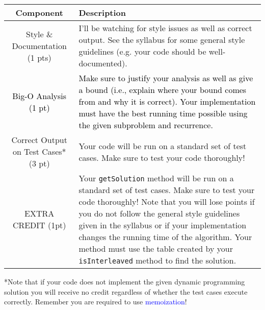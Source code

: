 \documentclass[11pt]{exam}
\begin{document}
\begin{center}
  \begin{tabular}{| c | p{9cm} |}
	\hline
	Component & Description 	\\
    \hline
    Style \& Documentation  (1 pts) & I'll be watching for style issues as well as correct output.  See the syllabus for some general style guidelines (e.g. your code should be well-documented). 
		\\ \hline
		\textcolor{black}{Big-O Analysis (1 pt)} & \textcolor{black}{Make sure to justify your analysis as well as give a bound (i.e., explain where your bound comes from and why it is correct).  Your implementation must have the best running time possible using the given subproblem and recurrence.}\\
		\hline
 Correct Output on Test Cases* (3 pt) & Your code will be run on a standard set of test cases.  Make sure to test your code thoroughly! \\ \hline
	EXTRA CREDIT (1pt) & Your \texttt{getSolution} method will be run on a standard set of test cases.  Make sure to test your code thoroughly!  Note that you will lose points if you do not follow the general style guidelines given in the syllabus or if your implementation changes the running time of the algorithm. Your method must use the table created by your \texttt{isInterleaved} method to find the solution. \\ \hline
  \end{tabular}
\end{center}
*Note that if your code does not implement the given dynamic programming solution you will receive no credit regardless of whether the test cases execute correctly.  Remember you are required to use \textcolor{blue}{memoization}!
\end{document}
